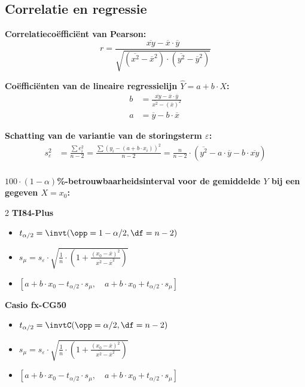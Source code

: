 \subsection*{Correlatie en regressie}

\textbf{Correlatiecoëfficiënt van Pearson:}
\[
    r = \frac{\overline{xy} - \overline{x} \cdot \overline{y}}{\sqrt{(\overline{x^2} - \overline{x}^2)\cdot(\overline{y^2} - \overline{y}^2)}}
\]


\textbf{Coëfficiënten van de lineaire regressielijn $\hat{Y} = a + b\cdot X$:}
\begin{align*}
    b &= \frac{\overline{xy} - \overline{x} \cdot \overline{y}}{\overline{x^2} - (\overline{x})^2} \\
    a &= \overline{y} - b \cdot \overline{x}
\end{align*}

\textbf{Schatting van de variantie van de storingsterm $\varepsilon$:}
\begin{align*}
    s_{\varepsilon}^2 &= \frac{\sum e_i^2}{n - 2} = \frac{\sum \left(y_i - (a + b \cdot x_i)\right)^2}{n - 2}=  \frac{n}{n-2} \cdot \left( \overline{y^2} - a \cdot \overline{y} - b \cdot \overline{xy} \right) \\ 
\end{align*}

\textbf{\boldmath$100\cdot(1-\alpha)$\si{\percent}-betrouwbaarheidsinterval voor de gemiddelde $Y$ bij een gegeven $X = x_0$:}
    \begin{multicols}{2}
        \centering\textbf{TI84-Plus}
            \begin{itemize}
                \item $t_{\alpha/2} = \invt(\opp=1-\alpha/2, \df = n - 2)$
                \item $s_\mu = s_{\varepsilon} \cdot \sqrt{ \frac{1}{n} \cdot \left( 1 + \frac{(x_0 - \overline{x})^2}{\overline{x^2} - \overline{x}^2} \right) }$
                \item $[a+b\cdot x_0 - t_{\alpha/2} \cdot s_\mu, \quad a+b\cdot x_0 + t_{\alpha/2} \cdot s_\mu]$
            \end{itemize}
            \columnbreak
            \centering\textbf{Casio fx-CG50}
            \begin{itemize}
                \item $t_{\alpha/2} = \invtC(\opp=\alpha/2, \df = n - 2)$
                \item $s_\mu = s_{\varepsilon} \cdot \sqrt{ \frac{1}{n} \cdot \left( 1 + \frac{(x_0 - \overline{x})^2}{\overline{x^2} - \overline{x}^2} \right) }$
                \item $[a+b\cdot x_0 - t_{\alpha/2} \cdot s_\mu, \quad a+b\cdot x_0 + t_{\alpha/2} \cdot s_\mu]$
            \end{itemize}
    \end{multicols}

